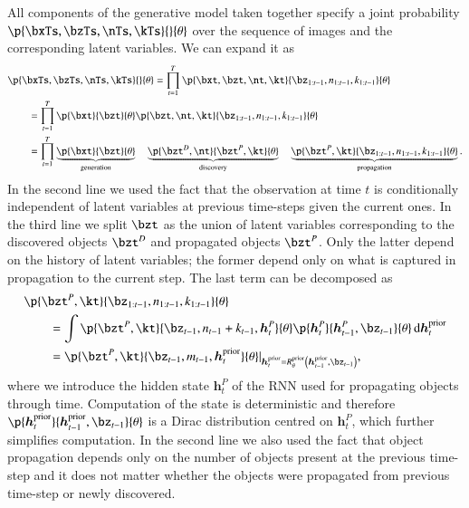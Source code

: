 All components of the generative model taken together specify a joint probability $\p{\bxTs, \bzTs,\nTs,\kTs}{}{\theta}$ over the sequence of images and the corresponding latent variables. We can expand it as
\begin{equation}
\begin{aligned}
    &\p{\bxTs, \bzTs,\nTs,\kTs}{}{\theta} = \prod_{t=1}^T \p{\bxt, \bzt, \nt, \kt}{\bz_{1:t-1}, n_{1:t-1}, k_{1:t-1}}{\theta}\\
%    
    &\qquad= \prod_{t=1}^T \p{\bxt}{\bzt}{\theta} \p{\bzt, \nt, \kt}{\bz_{1:t-1}, n_{1:t-1}, k_{1:t-1}}{\theta}\\
%    
    &\qquad= \prod_{t=1}^T \underbrace{\p{\bxt}{\bzt}{\theta}}_\mathrm{generation} \quad \underbrace{\p{\bzt^D, \nt}{\bzt^P, \kt}{\theta}}_\mathrm{discovery} \quad \underbrace{\p{\bzt^P, \kt}{\bz_{1:t-1}, n_{1:t-1}, k_{1:t-1}}{\theta}}_\mathrm{propagation}.
\end{aligned}
\end{equation}
In the second line we used the fact that the observation at time $t$ is conditionally independent of latent variables at previous time-steps given the current ones. In the third line we split $\bzt$ as the union of latent variables corresponding to the discovered objects $\bzt^D$ and propagated objects $\bzt^P$. Only the latter depend on the history of latent variables; the former depend only on what is captured in propagation to the current step. The last term can be decomposed as
\begin{equation}
\begin{aligned}
&\p{\bzt^P, \kt}{\bz_{1:t-1}, n_{1:t-1}, k_{1:t-1}}{\theta}\\
%
&\qquad= \int \p{\bzt^P, \kt}{\bz_{t-1}, n_{t-1} + k_{t-1}, \bm{h}_t^P}{\theta} \p{\bm{h}_t^P}{\bm{h}_{t-1}^P, \bz_{t-1}}{\theta} \dint \bm{h}_t^\mathrm{prior}\\
%
&\qquad= \p{\bzt^P, \kt}{\bz_{t-1}, m_{t-1}, \bm{h}_t^\mathrm{prior}}{\theta} \lvert_{\bm{h}_t^\mathrm{prior} = R^\mathrm{prior}_\theta \left( \bm{h}_{t-1}^\mathrm{prior}, \bz_{t-1} \right)},
\end{aligned}
\end{equation}
where we introduce the hidden state $\bm{h}_t^P$ of the RNN used for propagating objects through time. Computation of the state is deterministic and therefore $\p{\bm{h}_t^\mathrm{prior}}{\bm{h}_{t-1}^\mathrm{prior}, \bz_{t-1}}{\theta}$ is a Dirac distribution centred on $\bm{h}_t^P$, which further simplifies computation. In the second line we also used the fact that object propagation depends only on the number of objects present at the previous time-step and it does not matter whether the objects were propagated from previous time-step or newly discovered.

